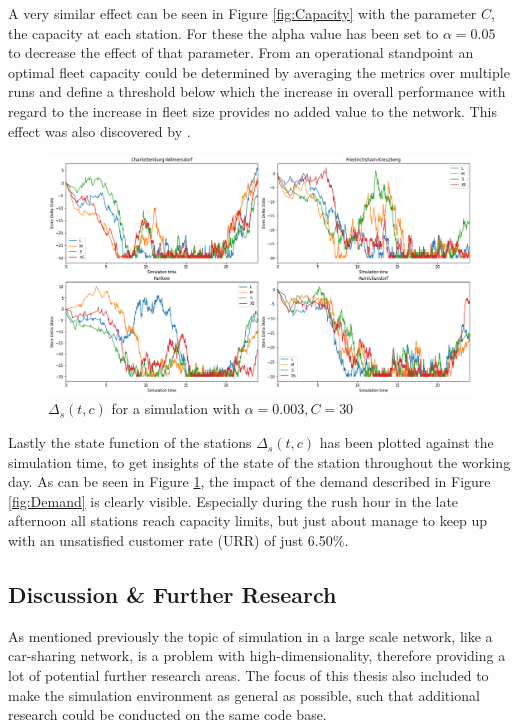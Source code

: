 A very similar effect can be seen in Figure \ref{fig:Capacity} with the parameter $C$,
the capacity at each station. For these the alpha value has been set to $\alpha = 0.05$ 
to decrease the effect of that parameter. From an operational standpoint an optimal
fleet capacity could be determined by averaging the metrics over multiple runs
and define a threshold below which the increase in overall performance with regard to the
increase in fleet size provides no added value to the network. This effect was also discovered
by .

\begin{figure}[htbp]
  \centering
  \includegraphics[width=\linewidth]{./Figures/delta-func.png}
  \caption{$\Delta_s(t, c)$ for a simulation with $\alpha=0.003, C=30$}
  \label{fig:DeltaFunc}
\end{figure}

Lastly the state function of the stations $\Delta_s(t, c)$ has been plotted against the
simulation time, to get insights of the state of the station throughout the working day.
As can be seen in Figure \ref{fig:DeltaFunc}, the impact of the demand described in Figure \ref{fig:Demand}
is clearly visible. Especially during the rush hour in the late afternoon all stations
reach capacity limits, but just about manage to keep up with an unsatisfied customer rate (URR)
of just 6.50\%. 

\subsection{Discussion \& Further Research}
\label{sub_sec:Results/Discussion}

As mentioned previously the topic of simulation in a large scale network, like a car-sharing network,
is a problem with high-dimensionality, therefore providing a lot of potential further research areas.
The focus of this thesis also included to make the simulation environment as general 
as possible, such that additional research could be conducted on the same code base.

